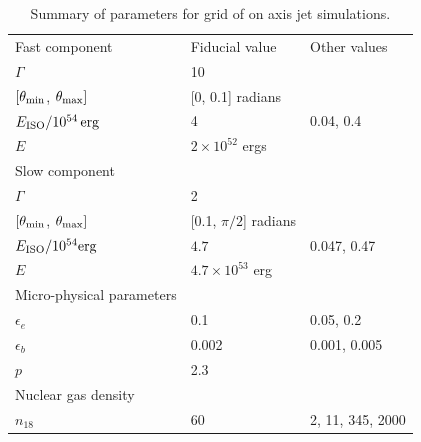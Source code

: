 \documentclass[usenatbib,fleqn]{mnras}
\begin{document}
\begin{table}
\begin{threeparttable}
  \caption{\label{tab:jetParams} Summary of parameters for grid of on
    axis jet simulations.}
  \begin{tabular*}{0.95\columnwidth}{lll}
    \hline
    {Fast component} & Fiducial value & Other values \\ 
    $\Gamma$ & 10 &\\
    $[\theta_{\rm min}$, $\theta_{\rm max}]$ & [0, 0.1] radians & \\
    $E_{\rm ISO}/10^{54} {\,\rm erg}$ & 4  & 0.04, 0.4\\
    $E$ & $2 \times 10^{52}$ ergs\\
    \hline 
    Slow component\\
    $\Gamma$ & 2 \\
    $[\theta_{\rm min}$, $\theta_{\rm max}]$ & [0.1, $\pi/2$] radians
    & \\
    $E_{\rm ISO}/10^{54} {\rm erg}$ & $4.7$ & 0.047, 0.47 \\
    $E$ & $4.7 \times 10^{53}$ erg & \\
    \hline
    Micro-physical parameters\\
    $\epsilon_e$ & 0.1 &  0.05, 0.2\\
    $\epsilon_b$ & 0.002 & 0.001, 0.005\\
    $p$ & 2.3\\
    \hline 
    Nuclear gas density \\
    $n_{18}$ & 60 & 2, 11, 345, 2000
  \end{tabular*}
\end{threeparttable}
\end{table}
\end{document}
